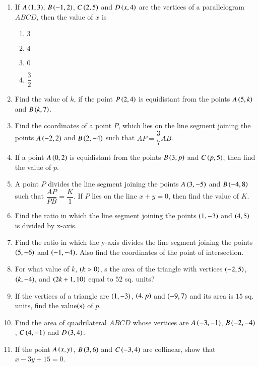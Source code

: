 \documentclass[journal,12pt,onecolumn]{IEEEtran}
\theoremstyle{remark}
\begin{document}
\begin{enumerate}
\item If $A\left(1,3\right)$, $B\left(-1,2\right)$, $C\left(2,5\right)$ and $D\left(x,4\right)$ are the vertices of a parallelogram $ABCD$, then the value of $x$ is
\begin{enumerate}
\item $3$\\
\item $4$\\
\item $0$\\
\item $\dfrac{3}{2}$\\
\end{enumerate}
\item Find the value of $k$, if the point $P\left(2,4\right)$ is equidistant from the points $A\left(5,k\right)$ and $B\left(k,7\right)$.\\
\item Find the coordinates of a point $P$, which lies on the line segment joining the points $A\left(-2,2\right)$ and $B\left(2,-4\right)$ such that $AP = \dfrac{3}{7} AB$.\\

\item If a point $A\left(0,2\right)$ is equidistant from the points $B\left(3,p\right)$ and $C\left(p,5\right)$, then find the value of $p$.\\
\item A point $P$ divides the line segment joining the points $A\left(3,-5\right)$ and $B\left(-4,8\right)$ such that $\dfrac{AP}{PB} = \dfrac{K}{1}$. If $P$ lies on the line $x + y = 0$, then find the value of $K$.\\
\item Find the ratio in which the line segment joining the points $\left(1,-3\right)$ and $\left(4,5\right)$ is divided by x-axis.\\
\item Find the ratio in which the y-axis divides the line segment joining the points $\left(5,-6\right)$ and $\left(-1,-4\right)$. Also find the coordinates of the point of intersection.\\

\item For what value of $k$, $\left( k > 0\right)$, s the area of the triangle with vertices $\left(-2,5\right)$, $\left(k,-4\right)$, and $\left(2k+1,10\right)$ equal to $52$ sq. units?\\

\item If the vertices of a triangle are $\left(1,-3\right)$, $\left(4,p\right)$ and $\left(-9,7\right)$ and its area is $15$ sq. units, find the value$\left(\text{s}\right)$ of $p$.\\
\item Find the area of quadrilateral $ABCD$ whose vertices are $A\left(-3,-1\right)$, $B\left(-2,-4\right)$, $C\left(4,-1\right)$ and $D\left(3,4\right)$.\\

\item If the point $A\left(x,y\right)$, $B\left(3,6\right)$ and $C\left(-3,4\right)$ are collinear, show that $x - 3y + 15 = 0$.\\
\end{enumerate}
\end{document}
